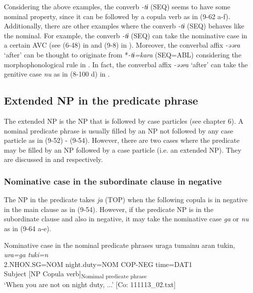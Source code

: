 Considering the above examples, the converb \textit{{}-tɨ} (SEQ) seems to have some nominal property, since it can be followed by a copula verb as in (9-62 a-f). Additionally, there are other examples where the converb \textit{{}-tɨ} (SEQ) behaves like the nominal. For example, the converb \textit{{}-tɨ} (SEQ) can take the nominative case in a certain AVC (see (6-48) in  and (9-8) in ). Moreover, the converbal affix \textit{{}-əəra} ‘after’ can be thought to originate from *\textit{{}-tɨ=kara} (SEQ=ABL) considering the morphophonological rule in . In fact, the converbal affix \textit{{}-əəra} ‘after’ can take the genitive case \textit{nu} as in (8-100 d) in .

\subsection{Extended NP in the predicate phrase}\label{sec:9.3.3}

The extended NP is the NP that is followed by case particles (see chapter 6). A nominal predicate phrase is usually filled by an NP not followed by any case particle as in (9-52) - (9-54). However, there are two cases where the predicate may be filled by an NP followed by a case particle (i.e. an extended NP). They are discussed in  and  respectively.

\subsubsection{Nominative case in the subordinate clause in negative}\label{sec:9.3.3.1}

The NP in the predicate takes \textit{ja} (TOP) when the following copula is in negative in the main clause as in (9-54). However, if the predicate NP is in the subordinate clause and also in negative, it may take the nominative case \textit{ga} or \textit{nu} as in (9-64 a-e).

\ea   Nominative case in the nominal predicate phrases \label{ex:9.64}
\ea \relax [= (5-9 b)]
    \gllll  uraga  tumainu  aran  tukin,\\
      \textit{ura=ga}  \textit{}  \textit{}  \textit{tuki=n}\\
      2.NHON.SG=NOM  night.duty=NOM  COP-NEG  time=DAT1\\
      Subject  [NP  Copula verb]\textsubscript{Nomimal predicate phrase}  \\
      \glt       ‘When you are not on night duty, ...’ [Co: 111113\_02.txt]

